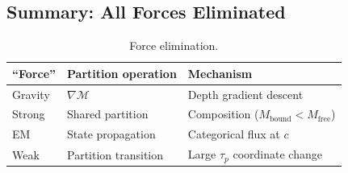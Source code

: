 \documentclass[11pt,twocolumn,a4paper]{article}
\theoremstyle{definition}
\theoremstyle{remark}
\newcommand{\Depth}{\mathcal{M}}
\newcommand{\taup}{\tau_p}
\newcommand{\Mfree}{M_{\mathrm{free}}}
\newcommand{\Mbound}{M_{\mathrm{bound}}}
\begin{document}
\subsection{Summary: All Forces Eliminated}

\begin{table}[H]
\centering
\caption{Force elimination.}
\small
\begin{tabular}{lll}
\toprule
\textbf{``Force''} & \textbf{Partition operation} & \textbf{Mechanism} \\
\midrule
Gravity & $\nabla\Depth$ & Depth gradient descent \\
Strong & Shared partition & Composition ($\Mbound < \Mfree$) \\
EM & State propagation & Categorical flux at $c$ \\
Weak & Partition transition & Large $\taup$ coordinate change \\
\bottomrule
\end{tabular}
\end{table}
\end{document}
